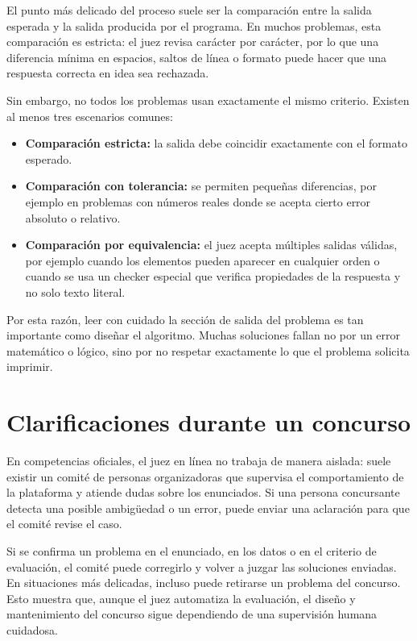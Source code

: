 El punto más delicado del proceso suele ser la comparación entre la salida esperada y la salida producida por el programa. En muchos problemas, esta comparación es estricta: el juez revisa carácter por carácter, por lo que una diferencia mínima en espacios, saltos de línea o formato puede hacer que una respuesta correcta en idea sea rechazada.

Sin embargo, no todos los problemas usan exactamente el mismo criterio. Existen al menos tres escenarios comunes:
\begin{itemize}
    \item \textbf{Comparación estricta:} la salida debe coincidir exactamente con el formato esperado.
    \item \textbf{Comparación con tolerancia:} se permiten pequeñas diferencias, por ejemplo en problemas con números reales donde se acepta cierto error absoluto o relativo.
    \item \textbf{Comparación por equivalencia:} el juez acepta múltiples salidas válidas, por ejemplo cuando los elementos pueden aparecer en cualquier orden o cuando se usa un checker especial que verifica propiedades de la respuesta y no solo texto literal.
\end{itemize}

Por esta razón, leer con cuidado la sección de salida del problema es tan importante como diseñar el algoritmo. Muchas soluciones fallan no por un error matemático o lógico, sino por no respetar exactamente lo que el problema solicita imprimir.

\section{Clarificaciones durante un concurso}

En competencias oficiales, el juez en línea no trabaja de manera aislada: suele existir un comité de personas organizadoras que supervisa el comportamiento de la plataforma y atiende dudas sobre los enunciados. Si una persona concursante detecta una posible ambigüedad o un error, puede enviar una aclaración para que el comité revise el caso.

Si se confirma un problema en el enunciado, en los datos o en el criterio de evaluación, el comité puede corregirlo y volver a juzgar las soluciones enviadas. En situaciones más delicadas, incluso puede retirarse un problema del concurso. Esto muestra que, aunque el juez automatiza la evaluación, el diseño y mantenimiento del concurso sigue dependiendo de una supervisión humana cuidadosa.

